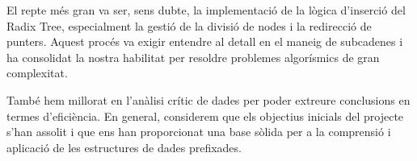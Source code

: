 El repte més gran va ser, sens dubte, la implementació de la lògica d'inserció del Radix Tree, especialment la gestió de la divisió de nodes i la redirecció de punters. Aquest procés va exigir entendre al detall en el maneig de subcadenes i ha consolidat la nostra habilitat per resoldre problemes algorísmics de gran complexitat.

També hem millorat en l'anàlisi crític de dades per poder extreure conclusions en termes d'eficiència. En general, considerem que els objectius inicials del projecte s'han assolit i que ens han proporcionat una base sòlida per a la comprensió i aplicació de les estructures de dades prefixades.

